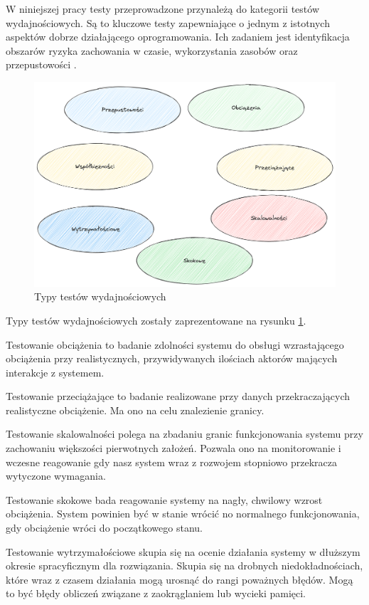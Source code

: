 W niniejszej pracy testy przeprowadzone przynależą do kategorii testów wydajnościowych.
Są to kluczowe testy zapewniające o jednym z istotnych aspektów dobrze działającego oprogramowania.
Ich zadaniem jest identyfikacja obszarów ryzyka zachowania w czasie, wykorzystania zasobów oraz przepustowości \cite{testerzyTestowanieWydajnoci}.

\begin{figure}[!hb]
	\centering \includegraphics[width=1\linewidth]{rysunki/performance-tests.png}
	\caption{Typy testów wydajnościowych}
	\label{rys:performance-tests}
\end{figure}

Typy testów wydajnościowych zostały zaprezentowane na rysunku \ref{rys:performance-tests}.

Testowanie obciążenia to badanie zdolności systemu do obsługi wzrastającego obciążenia przy realistycznych, przywidywanych ilościach aktorów mających interakcje z systemem.

Testowanie przeciążające to badanie realizowane przy danych przekraczających realistyczne obciążenie. 
Ma ono na celu znalezienie granicy.

Testowanie skalowalności polega na zbadaniu granic funkcjonowania systemu przy zachowaniu większości pierwotnych założeń.
Pozwala ono na monitorowanie i wczesne reagowanie gdy nasz system wraz z rozwojem stopniowo przekracza wytyczone wymagania.

Testowanie skokowe bada reagowanie systemy na nagły, chwilowy wzrost obciążenia.
System powinien być w stanie wrócić no normalnego funkcjonowania, gdy obciążenie wróci do początkowego stanu.

Testowanie wytrzymałościowe skupia się na ocenie działania systemy w dłuższym okresie spracyficznym dla rozwiązania.
Skupia się na drobnych niedokładnościach, które wraz z czasem działania mogą urosnąć do rangi poważnych błędów.
Mogą to być błędy obliczeń związane z zaokrąglaniem lub wycieki pamięci.

